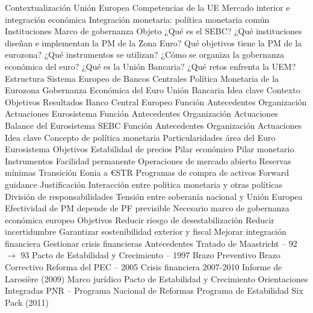 \documentclass{nuevotema}
\begin{document}
\begin{esquema}[enumerate]
	\1[] 
		\2 Contextualización
			\3 Unión Europea
			\3 Competencias de la UE
			\3 Mercado interior e integración económica
			\3 Integración monetaria: política monetaria común
			\3 Instituciones
			\3 Marco de gobernanza
		\2 Objeto
			\3 ¿Qué es el SEBC?
			\3 ¿Qué instituciones diseñan e implementan la PM de la Zona Euro?
			\3 Qué objetivos tiene la PM de la eurozona?
			\3 ¿Qué instrumentos se utilizan?
			\3 ¿Cómo se organiza la gobernanza económica del euro?
			\3 ¿Qué es la Unión Bancaria?
			\3 ¿Qué retos enfrenta la UEM?
		\2 Estructura
			\3 Sistema Europeo de Bancos Centrales
			\3 Política Monetaria de la Eurozona
			\3 Gobernanza Económica del Euro
			\3 Unión Bancaria
	\1 
		\2 Idea clave
			\3 Contexto
			\3 Objetivos
			\3 Resultados
		\2 Banco Central Europeo
			\3 Función
			\3 Antecedentes
			\3 Organización
			\3 Actuaciones
		\2 Eurosistema
			\3 Función
			\3 Antecedentes
			\3 Organización
			\3 Actuaciones
			\3 Balance del Eurosistema
		\2 SEBC
			\3 Función
			\3 Antecedentes
			\3 Organización
			\3 Actuaciones
	\1 
		\2 Idea clave
			\3 Concepto de política monetaria
			\3 Particularidades área del Euro
			\3 Eurosistema
		\2 Objetivos
			\3 Estabilidad de precios
			\3 Pilar económico
			\3 Pilar monetario
		\2 Instrumentos
			\3 Facilidad permanente
			\3 Operaciones de mercado abierto
			\3 Reservas mínimas
			\3 Transición Eonia a €STR
			\3 Programas de compra de activos
			\3 Forward guidance
	\1 
		\2 Justificación
			\3 Interacción entre política monetaria y otras políticas
			\3 División de responsabilidades
			\3 Tensión entre soberanía nacional y Unión Europea
			\3 Efectividad de PM depende de PF previsible
			\3[$\then$] Necesario marco de gobernanza económica europeo
		\2 Objetivos
			\3 Reducir riesgo de desestabilización
			\3 Reducir incertidumbre
			\3 Garantizar sostenibilidad exterior y fiscal
			\3 Mejorar integración financiera
			\3 Gestionar crisis financieras
		\2 Antecedentes
			\3 Tratado de Maastricht -- 92 $\to$ 93
			\3 Pacto de Estabilidad y Crecimiento -- 1997
			\3 Brazo Preventivo
			\3 Brazo Correctivo
			\3 Reforma del PEC -- 2005
			\3 Crisis financiera 2007-2010
			\3 Informe de Larosière (2009)
		\2 Marco jurídico
			\3 Pacto de Estabilidad y Crecimiento
			\3 Orientaciones Integradas
			\3 PNR -- Programa Nacional de Reformas
			\3 Programa de Estabilidad
			\3 Six Pack (2011)

\end{esquema}
\end{document}
